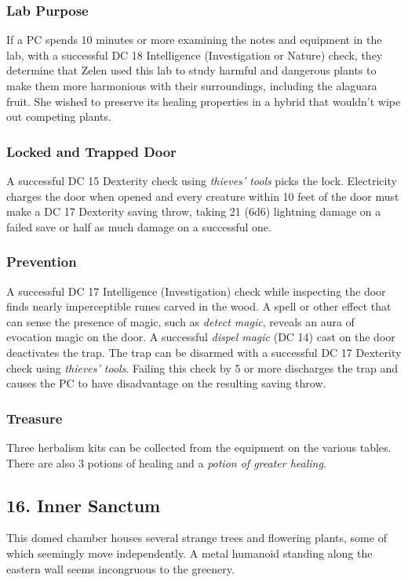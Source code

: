 \documentclass[10pt,a4paper,twoside,bg=print,twocolumn,openany,nodeprecatedcode]{dndbook}
\begin{document}
\subsubsection{Lab Purpose}
If a PC spends 10 minutes or more examining the notes and equipment in the lab, with a successful DC 18 Intelligence (Investigation or Nature) check, they determine that Zelen used this lab to study harmful and dangerous plants to make them more harmonious with their surroundings, including the alaguara fruit. She wished to preserve its healing properties in a hybrid that wouldn't wipe out competing plants.

\subsubsection{Locked and Trapped Door}
A successful DC 15 Dexterity check using \textit{thieves' tools} picks the lock. Electricity charges the door when opened and every creature within 10 feet of the door must make a DC 17 Dexterity saving throw, taking 21 (6d6) lightning damage on a failed save or half as much damage on a successful one.

\subsubsection{Prevention}
A successful DC 17 Intelligence (Investigation) check while inspecting the door finds nearly imperceptible runes carved in the wood. A spell or other effect that can sense the presence of magic, such as \textit{detect magic}, reveals an aura of evocation magic on the door. A successful \textit{dispel magic} (DC 14) cast on the door deactivates the trap. The trap can be disarmed with a successful DC 17 Dexterity check using \textit{thieves' tools}. Failing this check by 5 or more discharges the trap and causes the PC to have disadvantage on the resulting saving throw.

\subsubsection{Treasure}
Three herbalism kits can be collected from the equipment on the various tables. There are also 3 potions of healing and a \textit{potion of greater healing}.

\subsection{16. Inner Sanctum}
\begin{DndReadAloud}{}
This domed chamber houses several strange trees and flowering plants, some of which seemingly move independently. A metal humanoid standing along the eastern wall seems incongruous to the greenery.

\end{DndReadAloud}
\end{document}
